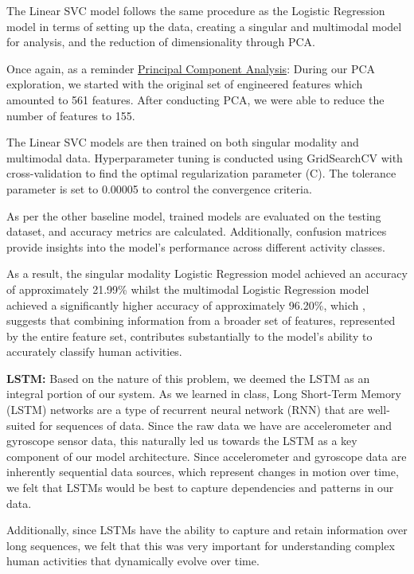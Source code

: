 \documentclass[11pt]{article}
\begin{document}
The Linear SVC model follows the same procedure as the Logistic Regression model in terms of setting up the data, creating a singular and multimodal model for analysis, and the reduction of dimensionality through PCA.

Once again, as a reminder \newline 
\underline{Principal Component Analysis}: During our PCA exploration, we started with the original set of engineered features which amounted to 561 features. After conducting PCA, we were able to reduce the number of features to 155. 


The Linear SVC models are then trained on both singular modality and multimodal data. Hyperparameter tuning is conducted using GridSearchCV with cross-validation to find the optimal regularization parameter (C). The tolerance parameter is set to 0.00005 to control the convergence criteria.

As per the other baseline model, trained models are evaluated on the testing dataset, and accuracy metrics are calculated. Additionally, confusion matrices provide insights into the model's performance across different activity classes.

As a result, the singular modality Logistic Regression model achieved an accuracy of approximately 21.99\% whilst the multimodal Logistic Regression model achieved a significantly higher accuracy of approximately 96.20\%, which , suggests that combining information from a broader set of features, represented by the entire feature set, contributes substantially to the model's ability to accurately classify human activities.

\textbf{LSTM:} Based on the nature of this problem, we deemed the LSTM as an integral portion of our system. As we learned in class, Long Short-Term Memory (LSTM) networks are a type of recurrent neural network (RNN) that are well-suited for sequences of data. Since the raw data we have are accelerometer and gyroscope sensor data, this naturally led us towards the LSTM as a key component of our model architecture. Since accelerometer and gyroscope data are inherently sequential data sources, which represent changes in motion over time, we felt that LSTMs would be best to capture dependencies and patterns in our data. 

Additionally, since LSTMs have the ability to capture and retain information over long sequences, we felt that this was very important for understanding complex human activities that dynamically evolve over time.
\end{document}
